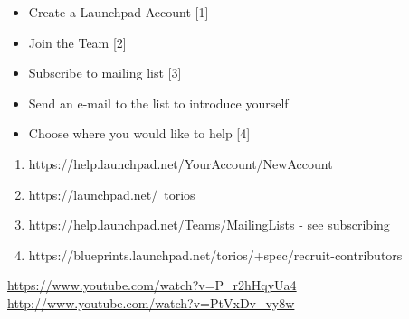 \documentclass[12pt,a4paper]{book}
\begin{document}
\begin{itemize}
\item{Create a Launchpad Account [1]}
\item{Join the Team [2]}
\item{Subscribe to mailing list [3]}
\item{Send an e-mail to the list to introduce yourself}
\item{Choose where you would like to help [4]}
\end{itemize}

\begin{enumerate}
\item {https://help.launchpad.net/YourAccount/NewAccount}
\item {https://launchpad.net/~torios}
\item {https://help.launchpad.net/Teams/MailingLists - see subscribing}
\item {https://blueprints.launchpad.net/torios/+spec/recruit-contributors}

\end{enumerate}

\url{https://www.youtube.com/watch?v=P_r2hHqyUa4}
\url{http://www.youtube.com/watch?v=PtVxDv_vy8w}
\end{document}
